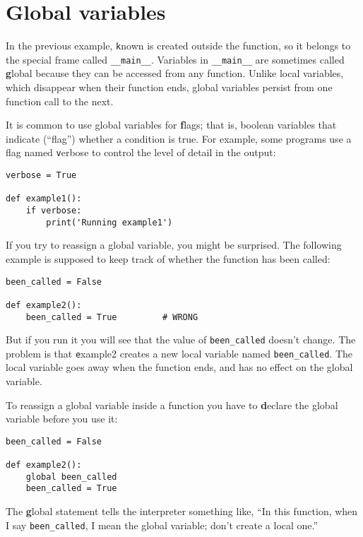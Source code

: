 \documentclass[
DIV=11,
fontsize=13,
twoside,
headinclude=false,
titlepage=firstiscover,
abstract=true,
headsepline=true,
footsepline=true,
chapterprefix=true, %
headings=big,
bibliography=totoc,%
captions=tableheading
]{scrbook}
\theoremstyle{definition}
\begin{document}
\section{Global variables}

In the previous example, {\texttt known} is created outside the function,
so it belongs to the special frame called \verb"__main__".
Variables in \verb"__main__" are sometimes called {\textbf global}
because they can be accessed from any function.  Unlike local
variables, which disappear when their function ends, global variables
persist from one function call to the next.

It is common to use global variables for {\textbf flags}; that is, 
boolean variables that indicate (``flag'') whether a condition
is true.  For example, some programs use
a flag named {\texttt verbose} to control the level of detail in the
output:

\begin{lstlisting}
verbose = True

def example1():
    if verbose:
        print('Running example1')
\end{lstlisting}
%
If you try to reassign a global variable, you might be surprised.
The following example is supposed to keep track of whether the
function has been called:

\begin{lstlisting}
been_called = False

def example2():
    been_called = True         # WRONG
\end{lstlisting}
%
But if you run it you will see that the value of \verb"been_called"
doesn't change.  The problem is that {\texttt example2} creates a new local
variable named \verb"been_called".  The local variable goes away when
the function ends, and has no effect on the global variable.

To reassign a global variable inside a function you have to
{\textbf declare} the global variable before you use it:

\begin{lstlisting}
been_called = False

def example2():
    global been_called 
    been_called = True
\end{lstlisting}
%
The {\textbf global statement} tells the interpreter
something like, ``In this function, when I say \verb"been_called", I
mean the global variable; don't create a local one.''
\end{document}
